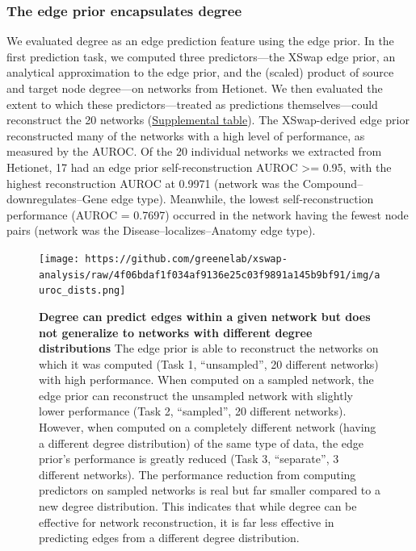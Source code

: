 \hypertarget{the-edge-prior-encapsulates-degree}{%
\subsubsection{The edge prior encapsulates degree}\label{the-edge-prior-encapsulates-degree}}

We evaluated degree as an edge prediction feature using the edge prior.
In the first prediction task, we computed three predictors---the XSwap edge prior, an analytical approximation to the edge prior, and the (scaled) product of source and target node degree---on networks from Hetionet.
We then evaluated the extent to which these predictors---treated as predictions themselves---could reconstruct the 20 networks (\protect\hyperlink{networks}{Supplemental table}).
The XSwap-derived edge prior reconstructed many of the networks with a high level of performance, as measured by the AUROC.
Of the 20 individual networks we extracted from Hetionet, 17 had an edge prior self-reconstruction AUROC \textgreater= 0.95, with the highest reconstruction AUROC at 0.9971 (network was the Compound--downregulates--Gene edge type).
Meanwhile, the lowest self-reconstruction performance (AUROC = 0.7697) occurred in the network having the fewest node pairs (network was the Disease--localizes--Anatomy edge type).

\begin{figure}
\hypertarget{fig:discrimination}{%
\centering
\texttt{[image: https://github.com/greenelab/xswap-analysis/raw/4f06bdaf1f034af9136e25c03f9891a145b9bf91/img/auroc\_dists.png]}
\caption{\textbf{Degree can predict edges within a given network but does not generalize to networks with different degree distributions}
The edge prior is able to reconstruct the networks on which it was computed (Task 1, ``unsampled'', 20 different networks) with high performance.
When computed on a sampled network, the edge prior can reconstruct the unsampled network with slightly lower performance (Task 2, ``sampled'', 20 different networks).
However, when computed on a completely different network (having a different degree distribution) of the same type of data, the edge prior's performance is greatly reduced (Task 3, ``separate'', 3 different networks).
The performance reduction from computing predictors on sampled networks is real but far smaller compared to a new degree distribution.
This indicates that while degree can be effective for network reconstruction, it is far less effective in predicting edges from a different degree distribution.}\label{fig:discrimination}
}
\end{figure}

